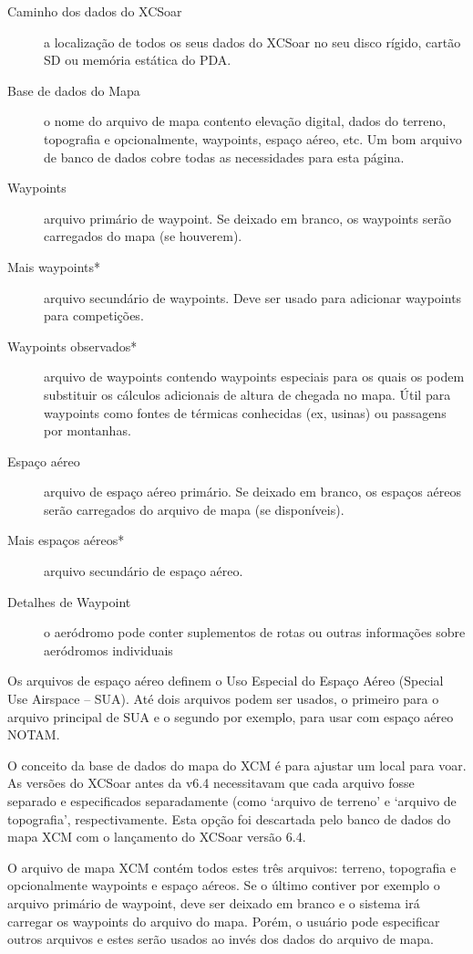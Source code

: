 \begin{description}
\item[Caminho dos dados do XCSoar]  a localização de todos os seus dados do XCSoar no seu disco rígido, cartão SD ou memória estática do PDA.
\item[Base de dados do Mapa]  o nome do arquivo de mapa contento elevação digital, dados do terreno, topografia e opcionalmente, waypoints, espaço aéreo, etc.  Um bom arquivo de banco de dados cobre todas as necessidades para esta página.
\item[Waypoints]  arquivo primário de waypoint.  Se deixado em branco, os waypoints serão carregados do mapa (se houverem).
\item[Mais waypoints*]  arquivo secundário de waypoints.  Deve ser usado para adicionar waypoints para competições.
\item[Waypoints observados*]  arquivo de waypoints contendo waypoints especiais para os quais os podem substituir os cálculos adicionais de altura de chegada no mapa.  Útil para waypoints como fontes de térmicas conhecidas (ex, usinas) ou passagens por montanhas.
\item[Espaço aéreo]  arquivo de espaço aéreo primário.  Se deixado em branco, os espaços aéreos serão carregados do arquivo de mapa (se disponíveis).
\item[Mais espaços aéreos*] arquivo secundário de espaço aéreo.
\item[Detalhes de Waypoint] o aeródromo pode conter suplementos de rotas ou outras informações sobre aeródromos individuais
\end{description}

Os arquivos de espaço aéreo definem o Uso Especial do Espaço Aéreo (Special Use Airspace – SUA).  Até dois arquivos podem ser usados, o primeiro para o arquivo principal de SUA e o segundo por exemplo, para usar com espaço aéreo NOTAM.

O conceito da base de dados do mapa do XCM é para ajustar um local para voar.  As versões do XCSoar antes da v6.4 necessitavam que cada arquivo fosse separado e especificados separadamente (como ‘arquivo de terreno’ e ‘arquivo de topografia’, respectivamente.  Esta opção foi descartada pelo banco de dados do mapa XCM com o lançamento do XCSoar versão 6.4.

O arquivo de mapa XCM contém todos estes três arquivos: terreno, topografia e opcionalmente waypoints e espaço aéreos.  Se o último contiver por exemplo o arquivo primário de waypoint, deve ser deixado em branco e o sistema irá carregar os waypoints do arquivo do mapa.  Porém, o usuário pode especificar outros arquivos e estes serão usados ao invés dos dados do arquivo de mapa.

